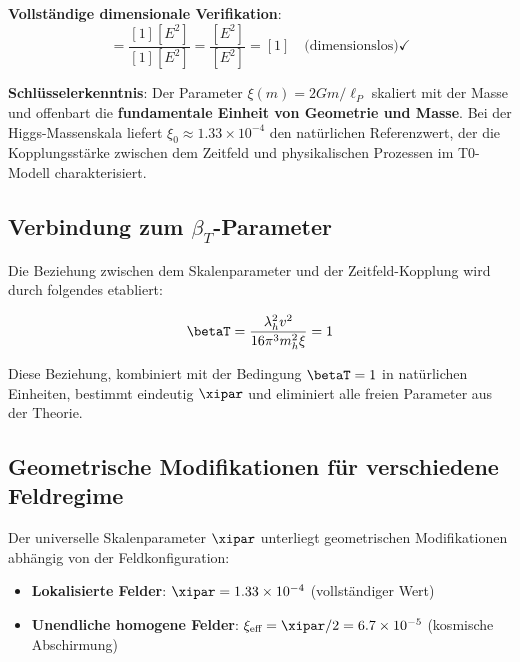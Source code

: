	\textbf{Vollständige dimensionale Verifikation}:
	\begin{equation}
		[\xi] = \frac{[1][E^2]}{[1][E^2]} = \frac{[E^2]}{[E^2]} = [1] \quad \text{(dimensionslos)} \checkmark
	\end{equation}
	
\begin{tcolorbox}[colback=green!5!white,colframe=green!75!black,title=Universeller Skalenparameter]
	\textbf{Schlüsselerkenntnis}: Der Parameter $\xi(m) = 2Gm/\ell_P$ skaliert mit der Masse und offenbart die \textbf{fundamentale Einheit von Geometrie und Masse}. Bei der Higgs-Massenskala liefert $\xi_0 \approx 1.33 \times 10^{-4}$ den natürlichen Referenzwert, der die Kopplungsstärke zwischen dem Zeitfeld und physikalischen Prozessen im T0-Modell charakterisiert.
\end{tcolorbox}
	
	\subsection{Verbindung zum $\beta_T$-Parameter}
	\label{subsec:beta_t_verbindung}
	
	Die Beziehung zwischen dem Skalenparameter und der Zeitfeld-Kopplung wird durch folgendes etabliert:
	
	\begin{equation}
		\betaT = \frac{\lambda_h^2 v^2}{16\pi^3 m_h^2 \xi} = 1
		\label{eq:beta_t_beziehung}
	\end{equation}
	
	Diese Beziehung, kombiniert mit der Bedingung $\betaT = 1$ in natürlichen Einheiten, bestimmt eindeutig $\xipar$ und eliminiert alle freien Parameter aus der Theorie.
	
	\subsection{Geometrische Modifikationen für verschiedene Feldregime}
	\label{subsec:geometrische_modifikationen}
	
	Der universelle Skalenparameter $\xipar$ unterliegt geometrischen Modifikationen abhängig von der Feldkonfiguration:
	
	\begin{itemize}
		\item \textbf{Lokalisierte Felder}: $\xipar = 1.33 \times 10^{-4}$ (vollständiger Wert)
		\item \textbf{Unendliche homogene Felder}: $\xi_{\text{eff}} = \xipar/2 = 6.7 \times 10^{-5}$ (kosmische Abschirmung)
	\end{itemize}
	
